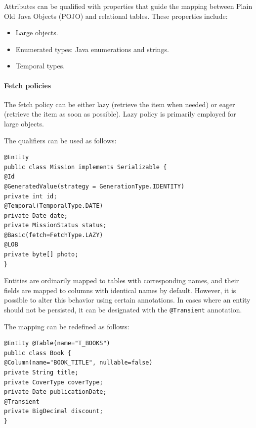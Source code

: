 Attributes can be qualified  with properties that guide the mapping between Plain Old Java Objects (POJO) and relational tables. 
These properties include:
\begin{itemize}
    \item Large objects.
    \item Enumerated types: Java enumerations and strings. 
    \item Temporal types.
\end{itemize}

\paragraph*{Fetch policies}
The fetch policy can be either lazy (retrieve the item when needed) or eager (retrieve the item as soon as possible).
Lazy policy is primarily employed for large objects.
\begin{example}
    The qualifiers can be used as follows: 
    \begin{lstlisting}[style=Java]
@Entity
public class Mission implements Serializable {
@Id
@GeneratedValue(strategy = GenerationType.IDENTITY)
private int id;
@Temporal(TemporalType.DATE)
private Date date;
private MissionStatus status;
@Basic(fetch=FetchType.LAZY)
@LOB
private byte[] photo;
}
    \end{lstlisting}
\end{example}

Entities are ordinarily mapped to tables with corresponding names, and their fields are mapped to columns with identical names by default.
However, it is possible to alter this behavior using certain annotations.
In cases where an entity should not be persisted, it can be designated with the \texttt{@Transient} annotation.
\begin{example}
    The mapping can be redefined as follows: 
    \begin{lstlisting}[style=Java]
@Entity @Table(name="T_BOOKS")
public class Book {
@Column(name="BOOK_TITLE", nullable=false)
private String title;
private CoverType coverType;
private Date publicationDate;
@Transient
private BigDecimal discount;
}
    \end{lstlisting}
\end{example}

